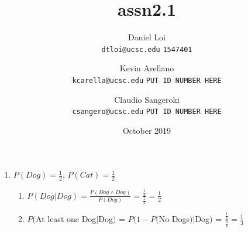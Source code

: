 \documentclass[12pt]{article}
\title{assn2.1}
\author{
  Daniel Loi\\
  \texttt{dtloi@ucsc.edu}
  \texttt{1547401}
  \and
  Kevin Arellano\\
  \texttt{kcarella@ucsc.edu}
  \texttt{PUT ID NUMBER HERE}
  \and
  Claudio Sangeroki\\
  \texttt{csangero@ucsc.edu}
  \texttt{PUT ID NUMBER HERE}
}
\date{October 2019}
\begin{document}
\maketitle

\begin{enumerate}
    \item 
        $P(Dog) = \frac{1}{2}$,
        $P(Cat) = \frac{1}{2}$
        \begin{enumerate}
        \item $P(Dog | Dog) = \frac{P(Dog \land Dog)}{P(Dog)} = \frac{\frac{1}{4}}{\frac{1}{2}} = \frac{1}{2}$  
        \item $P($At least one Dog$|$Dog$)$ = $P(1 - P($No Dogs$) | $Dog$)$ = $\frac{\frac{1}{4}}{\frac{3}{4}} = \frac{1}{3}$
        \end{enumerate}
    
    
\end{enumerate}
    
\end{document}
